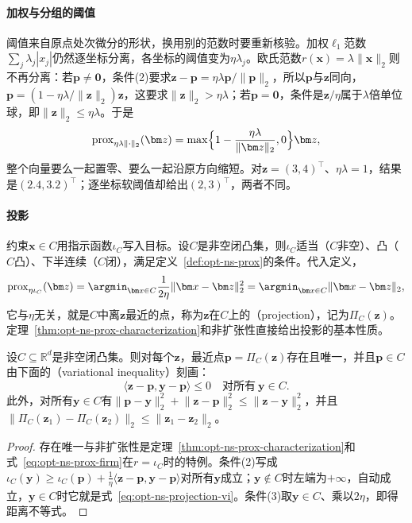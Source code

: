 \paragraph{加权与分组的阈值}
阈值来自原点处次微分的形状，换用别的范数时要重新核验。加权$\ell_1$范数$\sum_j\lambda_j|x_j|$仍然逐坐标分离，各坐标的阈值变为$\eta\lambda_j$。欧氏范数$r(\bm x)=\lambda\lVert\bm x\rVert_2$则不再分离：若$\bm p\neq\bm 0$，条件(2)要求$\bm z-\bm p=\eta\lambda\bm p/\lVert\bm p\rVert_2$，所以$\bm p$与$\bm z$同向，$\bm p=(1-\eta\lambda/\lVert\bm z\rVert_2)\bm z$，这要求$\lVert\bm z\rVert_2>\eta\lambda$；若$\bm p=\bm 0$，条件是$\bm z/\eta$属于$\lambda$倍单位球，即$\lVert\bm z\rVert_2\leq\eta\lambda$。于是
\[
 \operatorname{prox}_{\eta\lambda\lVert\cdot\rVert_2}(\bm z)=\max\Bigl\{1-\frac{\eta\lambda}{\lVert\bm z\rVert_2},0\Bigr\}\bm z ,
\]
整个向量要么一起置零、要么一起沿原方向缩短。对$\bm z=(3,4)^\top$、$\eta\lambda=1$，结果是$(2.4,3.2)^\top$；逐坐标软阈值却给出$(2,3)^\top$，两者不同。

\paragraph{投影}
约束$\bm x\in C$用指示函数$\iota_C$写入目标。设$C$是非空闭凸集，则$\iota_C$适当（$C$非空）、凸（$C$凸）、下半连续（$C$闭），满足定义~\ref{def:opt-ns-prox}的条件。代入定义，
\[
 \operatorname{prox}_{\eta\iota_C}(\bm z)=\argmin_{\bm x\in C}\frac1{2\eta}\lVert\bm x-\bm z\rVert_2^2=\argmin_{\bm x\in C}\lVert\bm x-\bm z\rVert_2 ,
\]
它与$\eta$无关，就是$C$中离$\bm z$最近的点，称为$\bm z$在$C$上的（projection），记为$\Pi_C(\bm z)$。定理~\ref{thm:opt-ns-prox-characterization}和非扩张性直接给出投影的基本性质。

\begin{theorem}[闭凸集上的投影]
\label{thm:opt-ns-projection}
设$C\subseteq\mathbb R^d$是非空闭凸集。则对每个$\bm z$，最近点$\bm p=\Pi_C(\bm z)$存在且唯一，并且$\bm p\in C$由下面的（variational inequality）刻画：
\begin{equation}
 \langle\bm z-\bm p,\bm y-\bm p\rangle\leq0\quad\text{对所有}\ \bm y\in C.
 \label{eq:opt-ns-projection-vi}
\end{equation}
此外，对所有$\bm y\in C$有$\lVert\bm p-\bm y\rVert_2^2+\lVert\bm z-\bm p\rVert_2^2\leq\lVert\bm z-\bm y\rVert_2^2$，并且$\lVert\Pi_C(\bm z_1)-\Pi_C(\bm z_2)\rVert_2\leq\lVert\bm z_1-\bm z_2\rVert_2$。
\end{theorem}

\begin{proof}
存在唯一与非扩张性是定理~\ref{thm:opt-ns-prox-characterization}和式~\eqref{eq:opt-ns-prox-firm}在$r=\iota_C$时的特例。条件(2)写成$\iota_C(\bm y)\geq\iota_C(\bm p)+\frac1\eta\langle\bm z-\bm p,\bm y-\bm p\rangle$对所有$\bm y$成立；$\bm y\notin C$时左端为$+\infty$，自动成立，$\bm y\in C$时它就是式~\eqref{eq:opt-ns-projection-vi}。条件(3)取$\bm y\in C$、乘以$2\eta$，即得距离不等式。
\end{proof}

